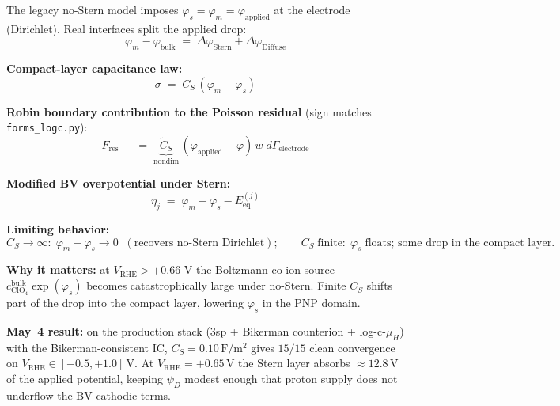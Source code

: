 \documentclass[11pt]{article}
\newcommand{\Eeq}{E_{\mathrm{eq}}}
\newcommand{\VRHE}{V_{\mathrm{RHE}}}
\begin{document}
\begin{tcolorbox}[cardstyle={Stern compact layer (Robin BC)}]
The legacy no-Stern model imposes
\(\varphi_s = \varphi_m = \varphi_{\mathrm{applied}}\) at the
electrode (Dirichlet). Real interfaces split the applied drop:
\[
  \varphi_m - \varphi_{\mathrm{bulk}}
   \;=\; \Delta\varphi_{\mathrm{Stern}} + \Delta\varphi_{\mathrm{Diffuse}}
\]

\textbf{Compact-layer capacitance law:}
\[
  \sigma \;=\; C_S\,(\varphi_m - \varphi_s)
\]

\textbf{Robin boundary contribution to the Poisson residual} (sign
matches \texttt{forms\_logc.py}):
\[
  F_{\mathrm{res}} \;\mathrel{-}=\;
   \underbrace{\widetilde{C}_S}_{\text{nondim}}\,
   (\varphi_{\mathrm{applied}}-\varphi)\,w\;d\Gamma_{\mathrm{electrode}}
\]

\textbf{Modified BV overpotential under Stern:}
\[
  \eta_j \;=\; \varphi_m - \varphi_s - \Eeq^{(j)}
\]

\textbf{Limiting behavior:}
\[
  C_S\to\infty:\;\varphi_m - \varphi_s \to 0
   \;\;(\text{recovers no-Stern Dirichlet});\qquad
  C_S\;\text{finite}:\;\varphi_s\;\text{floats; some drop in the
  compact layer}.
\]

\textbf{Why it matters:} at \(\VRHE > +0.66\) V the Boltzmann co-ion
source \(c_{\mathrm{ClO_4}}^{\mathrm{bulk}}\exp(\varphi_s)\) becomes
catastrophically large under no-Stern. Finite \(C_S\) shifts part of
the drop into the compact layer, lowering \(\varphi_s\) in the PNP
domain.

\textbf{May~4 result:} on the production stack
(3sp + Bikerman counterion + log-c-\(\mu_H\)) with the
Bikerman-consistent IC, \(C_S = 0.10\,\si{\farad\per\meter\squared}\)
gives \(15/15\) clean convergence on
\(\VRHE\in[-0.5, +1.0]\,\)V. At \(\VRHE = +0.65\,\)V the Stern layer
absorbs \(\approx 12.8\,\)V of the applied potential, keeping
\(\psi_D\) modest enough that proton supply does not underflow the
BV cathodic terms.
\end{tcolorbox}
\end{document}
